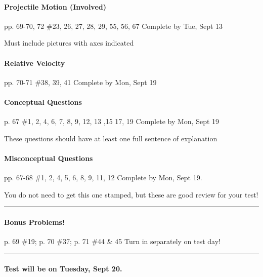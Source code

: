 \documentclass[10pt]{exam}
\begin{document}
\paragraph{Projectile Motion (Involved)} pp. 69-70, 72 \#23, 26, 27, 28, 29, 55, 56, 67
\dotfill Complete by Tue, Sept 13
   
{\sc Must include pictures with axes indicated}




\paragraph{Relative Velocity} pp. 70-71 \#38, 39, 41
\dotfill Complete by Mon, Sept 19
   


\paragraph{Conceptual Questions} p. 67 \#1, 2, 4, 6, 7, 8, 9, 12, 13 ,15 17, 19
\dotfill Complete by Mon, Sept 19
   
{\sc These questions should have at least one full sentence 
      of explanation}



\paragraph{Misconceptual Questions} pp. 67-68 \#1, 2, 4, 5, 6, 8, 9, 11, 12
\dotfill Complete by Mon, Sept 19.
   
{\sc You do not need to get this one stamped,
but these are good review for your test!}

\vspace{1em}
\hrule


\paragraph{Bonus Problems!} p. 69 \#19; p. 70 \#37; p. 71 \#44 \& 45
\dotfill Turn in separately on test day!

\vspace{1em}
\hrule



\paragraph{Test will be on Tuesday, Sept 20.} \hfill
\end{document}
